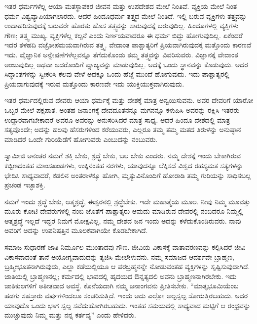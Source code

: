  ಇತರ ಧರ್ಮಗಳೆಲ್ಲ ಆಯಾ ಮತಸ್ಥಾಪಕರ ಜೀವನ ಮತ್ತು ಉಪದೇಶದ ಮೇಲೆ ನಿಂತಿವೆ. ವ್ಯಕ್ತಿಯ ಮೇಲೆ ನಿಂತ ಧರ್ಮ ವಿಶ್ವವ್ಯಾಪಿಯಾಗಲಾರದು. ಆದರೆ ಹಿಂದೂಧರ್ಮ ತತ್ತ್ವದ ಮೇಲೆ ನಿಂತಿದೆ. ಇಲ್ಲಿ ಬರುವ ವ್ಯಕ್ತಿಗಳು ತತ್ತ್ವವನ್ನು ಉದಾಹರಿಸುವುದಕ್ಕೆ ಬರುವರೇ ಹೊರತು ಹೊಸ ತತ್ತ್ವವನ್ನು ಸಾರುವುದಕ್ಕೆ ಬರುವುದಿಲ್ಲ. ಹಿಂದೂಗಳಲ್ಲಿ ವ್ಯಕ್ತಿಗಳು ಗೌಣ; ತತ್ತ್ವ ಮುಖ್ಯ. ವ್ಯಕ್ತಿಗಳೆಲ್ಲ ಕಲ್ಪನೆ ಎಂದು ನಿರ್ಣಯವಾದರೂ ಈ ಧರ್ಮ ಬಿದ್ದು ಹೋಗುವುದಿಲ್ಲ. ಏಕೆಂದರೆ ಇದರ ತಳಹದಿ ವಜ್ರೋಪಮಯವಾಗಿರುವ ತತ್ತ್ವ. ವೇದಾಂತ ಪಾಶ್ಚಾತ್ಯರಿಗೆ ಪ್ರಿಯವಾಗಿರುವುದಕ್ಕೆ ಮತ್ತೊಂದು ಕಾರಣವೆ ಇದು. ವೈಜ್ಞಾನಿಕ ಅನ್ವೇಷಣೆಗಳೆಲ್ಲವನ್ನೂ ತೆಗೆದುಕೊಂಡು ತಮ್ಮ ತತ್ತ್ವವನ್ನು ವಿವರಿಸುವರು. ವಿಜ್ಞಾನಕ್ಕೆ ವೇದಾಂತ ಅಂಜುವುದಿಲ್ಲ ಅಥವಾ ಅದರೊಂದಿಗೆ ವ್ಯಾಜ್ಯವನ್ನು ಮಾಡುವುದಿಲ್ಲ. ಅದಕ್ಕೆ ಒಂದು ಸ್ಥಾನವನ್ನು ಕೊಡುವುದು. ಅದರ ಸಿದ್ಧಾಂತಗಳನ್ನು ಸ್ವೀಕರಿಸಿ ಕೆಲವು ವೇಳೆ ಅದಕ್ಕೂ ಒಂದು ಹೆಜ್ಜೆ ಮುಂದೆ ಹೋಗುವುದು. ಇದು ಪಾಶ್ಚಾತ್ಯರಲ್ಲಿ ಪ್ರಿಯವಾಗುವುದಕ್ಕೆ ಇರುವ ಮತ್ತೊಂದು ಕಾರಣವೇ ಇದು ಯುಕ್ತಿಯುಕ್ತವಾಗಿರುವುದು. 

 ಇತರ ಧರ್ಮದಲ್ಲಿರುವ ದೇವರು ಆಯಾ ಧರ್ಮಕ್ಕೆ ಮತ್ತು ದೇಶಕ್ಕೆ ಮಾತ್ರ ಅನ್ವಯಿಸುವನು. ಅವರ ದೇವರಿಗೆ ಯಾರೋ ಒಬ್ಬರ ಮೇಲೆ ಪಕ್ಷಪಾತ. ಅಂತಹ ಜನಾಂಗಕ್ಕೆ ದೇವದೂತನನ್ನೂ ಮಗನನ್ನೂ ಕಳುಹಿಸಿ ಅವರನ್ನು ರಕ್ಷಿಸಿ ಇತರರು ಉದ್ಧಾರವಾಗಬೇಕಾದರೆ ಅವರೂ ಅವರನ್ನು ಅನುಸರಿಸಿದರೆ ಮಾತ್ರ ಸಾಧ್ಯ. ಆದರೆ ಹಿಂದೂ ದೇಶದಲ್ಲಿ ಮಾತ್ರ ಸತ್ಯವೊಂದೇ; ಅದನ್ನು ಹಲವು ಹೆಸರುಗಳಿಂದ ಕರೆಯುವರು, ಎಲ್ಲರೂ ತಮ್ಮ ತಮ್ಮ ಮತದ ತಿರುಳನ್ನು ಅನುಷ್ಠಾನ ಮಾಡಿದರೆ ಒಂದೇ ಗುರಿಯೆಡೆಗೆ ಹೋಗುವರು ಎಂಬುದನ್ನು ನಂಬುವರು. 

 ಸ್ವಾಮೀಜಿ ಅನಂತರ ನಮಗೆ ಶಕ್ತಿ ಬೇಕು, ಶ್ರದ್ಧೆ ಬೇಕು, ಬಲ ಬೇಕು ಎಂದರು. ನಮ್ಮ ದೇಶಕ್ಕೆ ಇಂದು ಬೇಕಾಗಿರುವ ಕಬ್ಬಿಣದಂತಹ ಮಾಂಸಖಂಡಗಳು, ಉಕ್ಕಿನಂತಹ ನರಗಳು, ಯಾವುದನ್ನೂ ಲೆಕ್ಕಿಸದೆ ವಿಶ್ವದ ರಹಸ್ಯಮತ ಸತ್ಯಗಳನ್ನು ಭೇದಿಸಿ ಸಾಧ್ಯವಾದರೆ, ಕಡಲಿನ ಅಂತರಾಳಕ್ಕೂ ಹೋಗಿ, ಮೃತ್ಯುವಿನೊಂದಿಗೆ ಹೋರಾಡಿ ತಮ್ಮ ಗುರಿಯನ್ನು ಸಾಧಿಸಬಲ್ಲ ಪ್ರಚಂಡ ಇಚ್ಛಾಶಕ್ತಿ. 

 ನಮಗೆ ಇಂದು ಶ್ರದ್ಧೆ ಬೇಕು, ಆತ್ಮಶ್ರದ್ಧೆ, ಈಶ್ವರನಲ್ಲಿ ಶ್ರದ್ಧೆಬೇಕು. ಇದೇ ಮಹಾತ್ಮೆಯ ಮೂಲ. ನೀವು ನಿಮ್ಮ ಮೂವತ್ತು ಮೂರು ಕೋಟಿ ದೇವರುಗಳಲ್ಲಿ ನಂಬಿ ಜೊತೆಗೆ ಪಾಶ್ಚಾತ್ಯರು ಆಮದು ಮಾಡಿರುವ ದೇವರಲ್ಲಿ ನಂಬಿದರೂ ನಿಮ್ಮಲ್ಲಿ ಆತ್ಮಶ್ರದ್ಧೆ ಇಲ್ಲದೆ ಇದ್ದರೆ ನಿಮಗೆ ಮೋಕ್ಷವಿಲ್ಲ, ನಮ್ಮ ದೇಶದ ಜನ ಇಂದು ಅದನ್ನು ಕಳೆದುಕೊಂಡಿರುವರು. ನಾವು ಅವರಿಗೆ ಅದನ್ನು ಉಪನಿಷತ್ತಿನ ಮೂಲಕವಾಗಿಯೇ ಕೊಡಬೇಕಾಗಿದೆ. 

 ಸಮಾಜ ಸುಧಾರಣೆ ಜಾತಿ ನಿರ್ಮೂಲ ಮುಂತಾದವು ಗೌಣ. ಜೀವಿಯ ವಿಕಾಸಕ್ಕೆ ವಾತಾವರಣವನ್ನು ಕಲ್ಪಿಸಿದರೆ ಜೀವಿ ವಿಕಾಸವಾದಂತೆ ತಾನೆ ಅಯೋಗ್ಯವಾದುದನ್ನು ತ್ಯಜಿಸಿ ಮೇಲೇಳುವನು. ನಮ್ಮ ಸಮಾಜದ ಆದರ್ಶವೇ ಬ್ರಾಹ್ಮಣ, ಬ್ರಹ್ಮೀಭೂತನಾಗಿರುವುದು, ಎಲ್ಲಾ ಕಡೆಯಲ್ಲಿಯೂ ಆ ಪರಬ್ರಹ್ಮನನ್ನೇ ನೋಡುವಂತಹ ವ್ಯಕ್ತಿಗಳನ್ನು ಸೃಷ್ಟಿಸುವುದಾಗಿದೆ. ಜಾತಿಯಲ್ಲಿ ಬ್ರಾಹ್ಮಣನಲ್ಲ; ಕರ್ಮದಲ್ಲಿ ಭಾವದಲ್ಲಿ ಹೃದಯದ ಔನ್ನತ್ಯದಲಿ ಅವನು ಬ್ರಾಹ್ಮಣನಾಗಿರಬೇಕು. ಇದು ಜಾತಿಕುಲಗಳಿಗೆ ಅತೀತವಾದ ಅವಸ್ಥೆ. ಕೊನೆಯದಾಗಿ ನಮ್ಮ ಜನಾಂಗವನು ಪ್ರೀತಿಸಬೇಕು. “ಮಾತೃಭೂಮಿಯೆಂಬ ಹಡಗು ಸಹಸ್ರಾರು ವರ್ಷಗಳಿಂದಲೂ ಸಂಚರಿಸುತ್ತಿದೆ. ಇಂದು ಅದು ಎಲ್ಲೋ ಅಲ್ಪಸ್ವಲ್ಪ ಸೋರುತ್ತಿರಬಹುದು. ಅದರ ಯಾವುದೊ ಒಂದು ಭಾಗ ಸ್ವಲ್ಪ ಸವೆದುಹೋಗಿರಬಹುದು. ಇಂತಹ ಸಮಯದಲ್ಲಿ ಸಾಧ್ಯವಾದ ಮಟ್ಟಿಗೆ ಆ ರಂಧ್ರವನ್ನು ಮುಚ್ಚುವುದು ನಿಮ್ಮ ಮತ್ತು ನನ್ನ ಕರ್ತವ್ಯ” ಎಂದು ಹೇಳಿದರು. 

